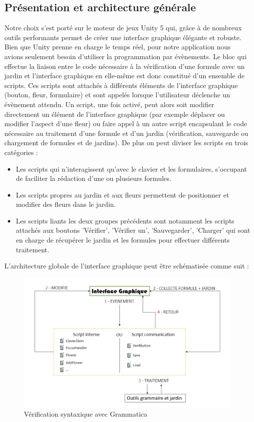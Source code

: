 \subsection{Présentation et architecture générale}
Notre choix s'est porté sur le moteur de jeux Unity 5 qui, grâce à de nombreux outils performants permet de créer une interface graphique élégante et robuste. Bien que Unity prenne en charge le temps réel, pour notre application nous avions seulement besoin d'utiliser la programmation par évènements. Le bloc qui effectue la liaison entre le code nécessaire à la vérification d'une formule avec un jardin et l'interface graphique en elle-même est donc constitué d'un ensemble de scripts. Ces scripts sont attachés à différents éléments de l'interface graphique (bouton, fleur, formulaire) et sont appelés lorsque l'utilisateur déclenche un évènement attendu. Un script, une fois activé, peut alors soit modifier directement un élément de l'interface graphique (par exemple déplacer ou modifier l'aspect d'une fleur) ou faire appel à un autre script encapsulant le code nécessaire au traitement d'une formule et d'un jardin (vérification, sauvegarde ou chargement de formules et de jardins). De plus on peut diviser les scripts en trois catégories :
\begin{itemize}
\item Les scripts qui n'interagissent qu'avec le clavier et les formulaires, s'occupant de faciliter la rédaction d'une ou plusieurs formules.
\item Les scripts propres au jardin et aux fleurs permettent de positionner et modifier des fleurs dans le jardin.
\item Les scripts liants les deux groupes précédents sont notamment les scripts attachés aux boutons 'Vérifier', 'Vérifier un', 'Sauvegarder', 'Charger' qui sont en charge de récupérer le jardin et les formules pour effectuer différents traitement.
\end{itemize}

L'architecture globale de l'interface graphique peut être schématisée comme suit :

\begin{center}
\begin{figure}[!h]
\includegraphics[scale=0.5]{choix_techniques/unity1.jpg}
\caption{Vérification syntaxique avec Grammatica}
\end{figure}
\end{center}
\clearpage

